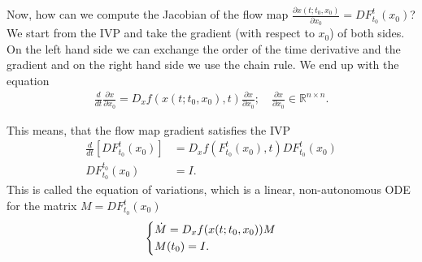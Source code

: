 Now, how can we compute the Jacobian of the flow map $\frac{\partial  {x}(t; t_0,  {x}_0)}{ \partial  {x}_0} = DF _{t_0}^{t}( {x}_0)$? We start from the IVP and take the gradient (with respect to $x_0$) of both sides. On the left hand side we can exchange the order of the time derivative and the gradient and on the right hand side we use the chain rule. We end up with the equation
\begin{align}
	\frac{d}{dt}\frac{\partial  {x}}{\partial  {x}_0} = D_ {x} f( {x}(t; t_0,  {x}_0), t) \frac{\partial  {x}}{\partial  {x}_0}; \quad \frac{\partial x}{\partial x_0} \in \mathbb{R}^{n \times n}.
\end{align}

This means, that the flow map gradient satisfies the IVP
\begin{subequations}\begin{align}
	\frac{d}{dt}\left[ DF_{t_0}^{t}( {x}_0)\right] &= D_{ {x}}f(F_{t_0}^{t}( {x}_0), t) DF_{t_0}^{t}( {x}_0) \\
	DF_{t_0}^{t_0}( {x}_0) &= I.
\end{align}\end{subequations}
This is called the equation of variations, which is a linear, non-autonomous ODE for the matrix $M = DF_{t_0}^{t}(x_0)$
\begin{align}
	\begin{dcases}
		\dot{M} = D_ {x} f( {x}(t; t_0,  {x}_0)) M \\ M(t_0) = I.
	\end{dcases}
\end{align}

